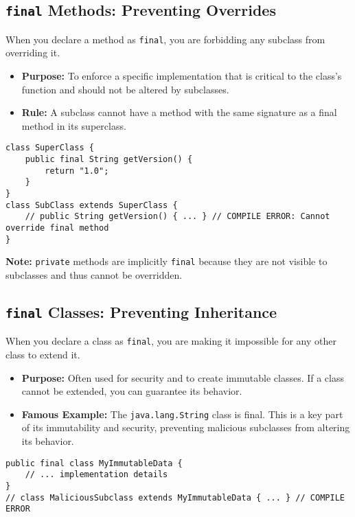 \documentclass[12pt]{article}
\begin{document}
\begin{enumerate}[label=(\arabic*)]
\subsection{\texttt{final} Methods: Preventing Overrides}
When you declare a method as \texttt{final}, you are forbidding any subclass from overriding it.
\begin{itemize}
    \item \textbf{Purpose:} To enforce a specific implementation that is critical to the class's function and should not be altered by subclasses.
    \item \textbf{Rule:} A subclass cannot have a method with the same signature as a final method in its superclass.
\end{itemize}
\begin{verbatim}
class SuperClass {
    public final String getVersion() {
        return "1.0";
    }
}
class SubClass extends SuperClass {
    // public String getVersion() { ... } // COMPILE ERROR: Cannot override final method
}
\end{verbatim}
\textbf{Note:} \texttt{private} methods are implicitly \texttt{final} because they are not visible to subclasses and thus cannot be overridden.

\subsection{\texttt{final} Classes: Preventing Inheritance}
When you declare a class as \texttt{final}, you are making it impossible for any other class to extend it.
\begin{itemize}
    \item \textbf{Purpose:} Often used for security and to create immutable classes. If a class cannot be extended, you can guarantee its behavior.
    \item \textbf{Famous Example:} The \texttt{java.lang.String} class is final. This is a key part of its immutability and security, preventing malicious subclasses from altering its behavior.
\end{itemize}
\begin{verbatim}
public final class MyImmutableData {
    // ... implementation details
}
// class MaliciousSubclass extends MyImmutableData { ... } // COMPILE ERROR
\end{verbatim}


\end{enumerate}
\end{document}
